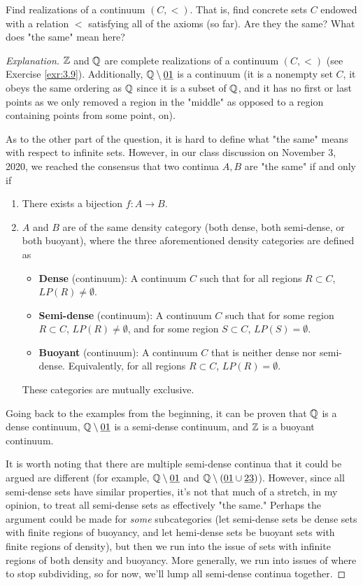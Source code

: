 \documentclass[../main.tex]{subfiles}
\begin{document}
\begin{exercise}\label{exr:3.27}
    Find realizations of a continuum $(C,<)$. That is, find concrete sets $C$ endowed with a relation $<$ satisfying all of the axioms (so far). Are they the same? What does "the same" mean here?
    \begin{proof}[Explanation]
        $\mathbb{Z}$ and $\mathbb{Q}$ are complete realizations of a continuum $(C,<)$ (see Exercise \ref{exr:3.9}). Additionally, $\mathbb{Q}\setminus\underline{01}$ is a continuum (it is a nonempty set $C$, it obeys the same ordering as $\mathbb{Q}$ since it is a subset of $\mathbb{Q}$, and it has no first or last points as we only removed a region in the "middle" as opposed to a region containing points from some point, on).\par
        As to the other part of the question, it is hard to define what "the same" means with respect to infinite sets. However, in our class discussion on November 3, 2020, we reached the consensus that two continua $A,B$ are "the same" if and only if
        \begin{enumerate}
            \item There exists a bijection $f:A\to B$.
            \item $A$ and $B$ are of the same density category (both dense, both semi-dense, or both buoyant), where the three aforementioned density categories are defined as
            \begin{itemize}
                \item \textbf{Dense} (continuum): A continuum $C$ such that for all regions $R\subset C$, $LP(R)\neq\emptyset$.
                \item \textbf{Semi-dense} (continuum): A continuum $C$ such that for some region $R\subset C$, $LP(R)\neq\emptyset$, and for some region $S\subset C$, $LP(S)=\emptyset$.
                \item \textbf{Buoyant} (continuum): A continuum $C$ that is neither dense nor semi-dense. Equivalently, for all regions $R\subset C$, $LP(R)=\emptyset$.
            \end{itemize}
            These categories are mutually exclusive.
        \end{enumerate}
        Going back to the examples from the beginning, it can be proven that $\mathbb{Q}$ is a dense continuum, $\mathbb{Q}\setminus\underline{01}$ is a semi-dense continuum, and $\mathbb{Z}$ is a buoyant continuum.\par
        It is worth noting that there are multiple semi-dense continua that it could be argued are different (for example, $\mathbb{Q}\setminus\underline{01}$ and $\mathbb{Q}\setminus(\underline{01}\cup\underline{23})$). However, since all semi-dense sets have similar properties, it's not that much of a stretch, in my opinion, to treat all semi-dense sets as effectively "the same." Perhaps the argument could be made for \emph{some} subcategories (let semi-dense sets be dense sets with finite regions of buoyancy, and let hemi-dense sets be buoyant sets with finite regions of density), but then we run into the issue of sets with infinite regions of both density and buoyancy. More generally, we run into issues of where to stop subdividing, so for now, we'll lump all semi-dense continua together.

\end{proof}
\end{exercise}
\end{document}
